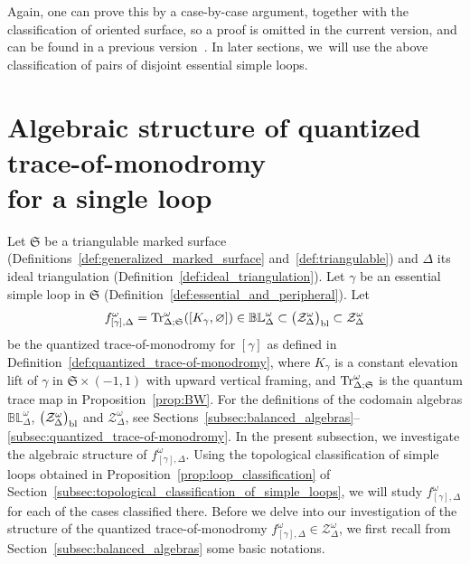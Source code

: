 \documentclass[pdftex]{sigma}
\numberwithin{equation}{section}
\theoremstyle{definition}
\begin{document}
Again, one can prove this by a case-by-case argument, together with the classification of oriented surface, so a proof is omitted in the current version, and can be found in a previous version~\cite{ver3}.
In later sections, we~will use the above classification of pairs of disjoint essential simple loops.
\section[Algebraic structure of quantized trace-of-monodromy for a single loop]{Algebraic structure of quantized trace-of-monodromy\\ for a single loop}
\label{sec:algebraic_structure_of_quantized_trace-of-monodromy}
Let $\mathfrak{S}$ be a triangulable marked surface (Definitions~\ref{def:generalized_marked_surface} and~\ref{def:triangulable}) and $\Delta$ its ideal triangulation (Definition~\ref{def:ideal_triangulation}).
Let $\gamma$ be an essential simple loop in $\mathfrak{S}$ (Definition~\ref{def:essential_and_peripheral}). Let
\[
f^\omega_{[\gamma],\Delta} = {\rm Tr}^\omega_{\Delta;\mathfrak{S}}([K_\gamma,{\varnothing}]) \in
\mathbb{BL}^\omega_\Delta \subset \bigl(\mathcal{Z}^\omega_\Delta\bigr)_{\rm bl} \subset \mathcal{Z}^\omega_\Delta
\]
be the quantized trace-of-monodromy for $ [\gamma]$ as defined in Definition~\ref{def:quantized_trace-of-monodromy}, where $K_\gamma$ is a constant elevation lift of $\gamma$ in $\mathfrak{S} \times (-1,1)$ with upward vertical framing, and ${\rm Tr}^\omega_{\Delta;\mathfrak{S}}$ is the quantum trace map in Proposition~\ref{prop:BW}. For the definitions of the codomain algebras $\mathbb{BL}^\omega_\Delta$, $\bigl(\mathcal{Z}^\omega_\Delta\bigr)_{\rm bl}$ and $\mathcal{Z}^\omega_\Delta$, see Sections~\ref{subsec:balanced_algebras}--\ref{subsec:quantized_trace-of-monodromy}. In the present subsection, we investigate the algebraic structure of $f^\omega_{[\gamma],\Delta}$. Using the topological classification of simple loops obtained in Proposition~\ref{prop:loop_classification} of Section~\ref{subsec:topological_classification_of_simple_loops}, we will study $f^\omega_{[\gamma],\Delta}$ for each of the cases classified there.
Before we delve into our investigation of the structure of the quantized trace-of-monodromy $f^\omega_{[\gamma],\Delta} \in \mathcal{Z}^\omega_\Delta$, we first recall from Section~\ref{subsec:balanced_algebras} some basic notations.
\end{document}
